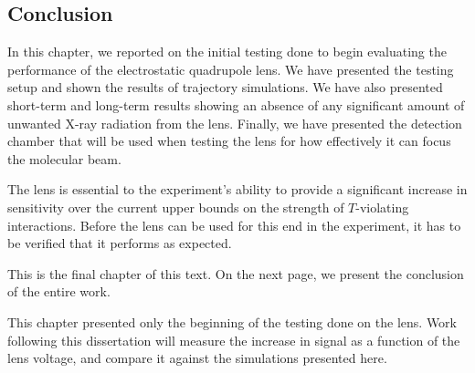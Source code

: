 \subsection{Conclusion}


In this chapter, we reported on the initial testing done to begin evaluating the
performance of the electrostatic quadrupole lens. We have presented the testing
setup and shown the results of trajectory simulations. We have also presented
short-term and long-term results showing an absence of any significant amount of
unwanted X-ray radiation from the lens. Finally, we have presented the detection
chamber that will be used when testing the lens for how effectively it can focus
the molecular beam.


The lens is essential to the experiment's ability to provide a significant
increase in sensitivity over the current upper bounds on the strength of
$T$-violating interactions. Before the lens can be used for this end in the
experiment, it has to be verified that it performs as expected.


This is the final chapter of this text. On the next page, we present the
conclusion of the entire work.


This chapter presented only the beginning of the testing done on the lens. Work
following this dissertation will measure the increase in signal as a function of
the lens voltage, and compare it against the simulations presented here.
